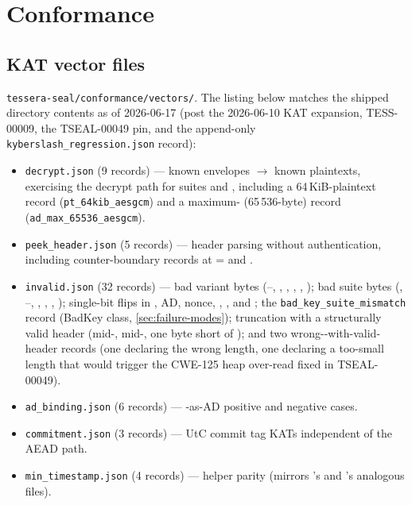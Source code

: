 \section{Conformance}
\label{sec:conformance}

\subsection{KAT vector files}

\texttt{tessera-seal/conformance/vectors/}. The listing below matches the shipped directory contents as of 2026-06-17 (post the 2026-06-10 KAT expansion, TESS-00009, the TSEAL-00049  pin, and the append-only \texttt{kyberslash\_regression.json} record):

\begin{itemize}
\item \texttt{decrypt.json} (9 records) --- known envelopes $\to$ known plaintexts, exercising the decrypt path for suites  and , including a 64\,KiB-plaintext record (\texttt{pt\_64kib\_aesgcm}) and a maximum- (65\,536-byte) record (\texttt{ad\_max\_65536\_aesgcm}).
\item \texttt{peek\_header.json} (5 records) --- header parsing without authentication, including counter-boundary records at  =  and .
\item \texttt{invalid.json} (32 records) --- bad variant bytes (--, , , , , ); bad suite bytes (, --, , , , ); single-bit flips in , AD, nonce, , , and ; the \texttt{bad\_key\_suite\_mismatch} record (BadKey class, \cref{sec:failure-modes}); truncation with a structurally valid header (mid-, mid-, one byte short of ); and two wrong--with-valid-header records (one declaring the wrong length, one declaring a too-small length that would trigger the CWE-125 heap over-read fixed in TSEAL-00049).
\item \texttt{ad\_binding.json} (6 records) --- \pqid{}-as-AD positive and negative cases.
\item \texttt{commitment.json} (3 records) --- UtC commit tag KATs independent of the AEAD path.
\item \texttt{min\_timestamp.json} (4 records) ---  helper parity (mirrors \pqid{}'s and \pqhash{}'s analogous files).

\end{itemize}
